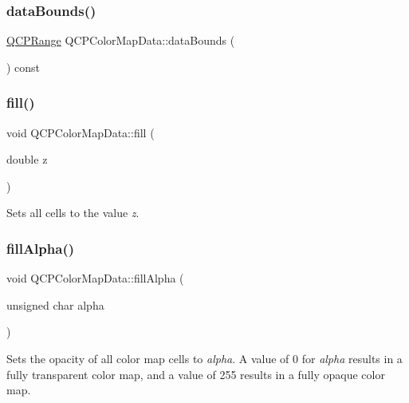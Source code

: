 \mbox{\label{class_q_c_p_color_map_data_ab7620248272c5ddd9a3f877f07179f6d}} 
\subsubsection{\texorpdfstring{dataBounds()}{dataBounds()}}
{\footnotesize\ttfamily \mbox{\hyperlink{class_q_c_p_range}{Q\+C\+P\+Range}} Q\+C\+P\+Color\+Map\+Data\+::data\+Bounds (\begin{DoxyParamCaption}{ }\end{DoxyParamCaption}) const\hspace{0.3cm}{\ttfamily [inline]}}

\mbox{\label{class_q_c_p_color_map_data_a350f783260eb9b5de5c7b5e0d5d3e3c2}} 
\subsubsection{\texorpdfstring{fill()}{fill()}}
{\footnotesize\ttfamily void Q\+C\+P\+Color\+Map\+Data\+::fill (\begin{DoxyParamCaption}\item[{double}]{z }\end{DoxyParamCaption})}

Sets all cells to the value {\itshape z}. \mbox{\label{class_q_c_p_color_map_data_a93e2a549d7702bc849cd48a585294657}} 
\subsubsection{\texorpdfstring{fillAlpha()}{fillAlpha()}}
{\footnotesize\ttfamily void Q\+C\+P\+Color\+Map\+Data\+::fill\+Alpha (\begin{DoxyParamCaption}\item[{unsigned char}]{alpha }\end{DoxyParamCaption})}

Sets the opacity of all color map cells to {\itshape alpha}. A value of 0 for {\itshape alpha} results in a fully transparent color map, and a value of 255 results in a fully opaque color map.

